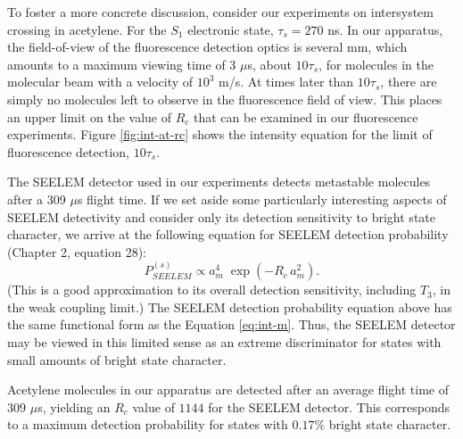 \documentclass[12pt]{mitthesis}
\begin{document}
To foster a more concrete discussion, consider our experiments on
intersystem crossing in acetylene.  For the $S_1$ electronic state,
$\tau_s=270$ ns.  In our apparatus, the field-of-view of the
fluorescence detection optics is several mm, which amounts to a
maximum viewing time of 3 $\mu$s, about $10\tau_s$, for molecules in
the molecular beam with a velocity of $10^3$ m/s.  At times later than
$10\tau_s$, there are simply no molecules left to observe in the
fluorescence field of view.  This places an upper limit on the value
of $R_c$ that can be examined in our fluorescence experiments.  Figure
\ref{fig:int-at-rc} shows the intensity equation for the limit of
fluorescence detection, $10\tau_s$.

The SEELEM detector used in our experiments detects metastable
molecules after a 309 $\mu$s flight time.  If we set aside some
particularly interesting aspects of SEELEM detectivity and consider
only its detection sensitivity to bright state character, we arrive at
the following equation for SEELEM detection probability (Chapter 2,
equation 28):
\begin{equation}
  \label{eq:seelem-prob-s}
  P_{SEELEM}^{(s)} \propto a_m^4 \; \exp \left( -R_c \, a_m^2 \right).
\end{equation}
(This is a good approximation to its overall detection sensitivity,
including $T_3$, in the weak coupling limit.)  The SEELEM detection
probability equation above has the same functional form as the
Equation \ref{eq:int-m}.  Thus, the SEELEM detector may be viewed in
this limited sense as an extreme discriminator for states with small
amounts of bright state character.

Acetylene molecules in our apparatus are detected after an average
flight time of 309 $\mu$s, yielding an $R_c$ value of $1144$ for the
SEELEM detector.  This corresponds to a maximum detection probability
for states with $0.17\%$ bright state character.  

\end{document}

